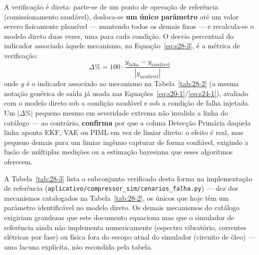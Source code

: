 \documentclass[12pt,a4paper]{article}
\numberwithin{equation}{section}
\numberwithin{table}{section}
\numberwithin{figure}{section}
\begin{document}
A verificação é direta: parte-se de um ponto de operação de referência (comissionamento saudável), desloca-se \textbf{um único parâmetro} até um valor severo fisicamente plausível — mantendo todos os demais fixos — e recalcula-se o modelo direto duas vezes, uma para cada condição. O desvio percentual do indicador associado àquele mecanismo, na Equação~\eqref{eq:s28-3}, é a métrica de verificação:
\begin{equation}\label{eq:s28-3}
\Delta\% = 100 \cdot \frac{y_{\text{falha}} - y_{\text{saudável}}}{|y_{\text{saudável}}|}
\end{equation}
onde $y$ é o indicador associado ao mecanismo na Tabela~\ref{tab:28-2} (a mesma notação genérica de saída já usada nas Equações~\eqref{eq:s20-1}/\eqref{eq:s24-1}), avaliado com o modelo direto sob a condição saudável e sob a condição de falha injetada. Um $|\Delta\%|$ pequeno mesmo em severidade extrema não invalida a linha do catálogo — ao contrário, \textbf{confirma} por que a coluna Detecção Primária daquela linha aponta EKF, VAE ou PIML em vez de limiar direto: o efeito é real, mas pequeno demais para um limiar ingênuo capturar de forma confiável, exigindo a fusão de múltiplas medições ou a estimação bayesiana que esses algoritmos oferecem.

A Tabela~\ref{tab:28-3} lista o subconjunto verificado desta forma na implementação de referência (\texttt{aplicativo/compressor\_sim/cenarios\_falha.py}) — dez dos mecanismos catalogados na Tabela~\ref{tab:28-2}, os únicos que hoje têm um parâmetro identificável no modelo direto. Os demais mecanismos do catálogo exigiriam grandezas que este documento equaciona mas que o simulador de referência ainda não implementa numericamente (espectro vibratório, correntes elétricas por fase) ou física fora do escopo atual do simulador (circuito de óleo) — uma lacuna explícita, não escondida pela tabela.
\end{document}
